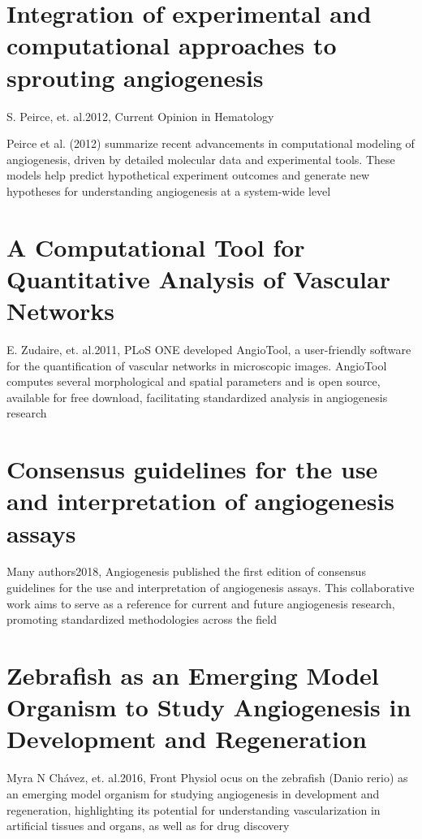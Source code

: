 \section{Integration of experimental and computational approaches to sprouting angiogenesis}{S. Peirce, et. al.}{2012, Current Opinion in Hematology}

Peirce et al. (2012) summarize recent advancements in computational modeling of angiogenesis, driven by detailed molecular data and experimental tools. These models help predict hypothetical experiment outcomes and generate new hypotheses for understanding angiogenesis at a system-wide level \cite{Peirce2012}

\section{A Computational Tool for Quantitative Analysis of Vascular Networks}{E. Zudaire, et. al.}{2011, PLoS ONE}
developed AngioTool, a user-friendly software for the quantification of vascular networks in microscopic images. AngioTool computes several morphological and spatial parameters and is open source, available for free download, facilitating standardized analysis in angiogenesis research \cite{Zudaire2011}

\section{Consensus guidelines for the use and interpretation of angiogenesis assays}{Many authors}{2018, Angiogenesis}
published the first edition of consensus guidelines for the use and interpretation of angiogenesis assays. This collaborative work aims to serve as a reference for current and future angiogenesis research, promoting standardized methodologies across the field \cite{NowakSliwinska2018a}

\section{Zebrafish as an Emerging Model Organism to Study Angiogenesis in Development and Regeneration}{Myra N Chávez, et. al.}{2016, Front Physiol}
ocus on the zebrafish (Danio rerio) as an emerging model organism for studying angiogenesis in development and regeneration, highlighting its potential for understanding vascularization in artificial tissues and organs, as well as for drug discovery \cite{Chavez2016}




	
	
	

\let\section\oldsection
